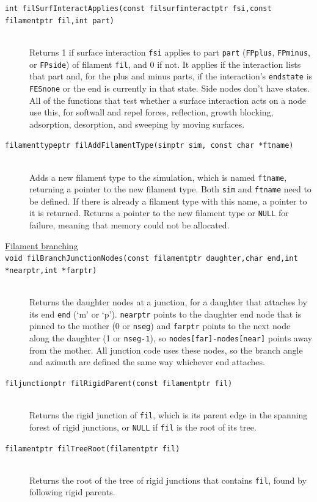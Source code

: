 \documentclass {scrbook}
\newcommand {\ttt} {\texttt}
\begin{document}
\begin{description}
\item[\ttt{int filSurfInteractApplies(const filsurfinteractptr fsi,const filamentptr fil,int part)}] %
\hfill \\
Returns 1 if surface interaction \ttt{fsi} applies to part \ttt{part} (\ttt{FPplus}, \ttt{FPminus}, or \ttt{FPside}) of filament \ttt{fil}, and 0 if not. It applies if the interaction lists that part and, for the plus and minus parts, if the interaction's \ttt{endstate} is \ttt{FESnone} or the end is currently in that state. Side nodes don't have states. All of the functions that test whether a surface interaction acts on a node use this, for softwall and repel forces, reflection, growth blocking, adsorption, desorption, and sweeping by moving surfaces.

\item[\ttt{filamenttypeptr filAddFilamentType(simptr sim, const char *ftname)}]
\hfill \\
Adds a new filament type to the simulation, which is named \ttt{ftname}, returning a pointer to the new filament type. Both \ttt{sim} and \ttt{ftname} need to be defined. If there is already a filament type with this name, a pointer to it is returned. Returns a pointer to the new filament type or \ttt{NULL} for failure, meaning that memory could not be allocated.

\item[\underline{Filament branching}]

\item[\ttt{void filBranchJunctionNodes(const filamentptr daughter,char end,int *nearptr,int *farptr)}] %
\hfill \\
Returns the daughter nodes at a junction, for a daughter that attaches by its end \ttt{end} (`m' or `p'). \ttt{nearptr} points to the daughter end node that is pinned to the mother (0 or \ttt{nseg}) and \ttt{farptr} points to the next node along the daughter (1 or \ttt{nseg-1}), so \ttt{nodes[far]-nodes[near]} points away from the mother. All junction code uses these nodes, so the branch angle and azimuth are defined the same way whichever end attaches.

\item[\ttt{filjunctionptr filRigidParent(const filamentptr fil)}] %
\hfill \\
Returns the rigid junction of \ttt{fil}, which is its parent edge in the spanning forest of rigid junctions, or \ttt{NULL} if \ttt{fil} is the root of its tree.

\item[\ttt{filamentptr filTreeRoot(filamentptr fil)}] %
\hfill \\
Returns the root of the tree of rigid junctions that contains \ttt{fil}, found by following rigid parents.


\end{description}
\end{document}
